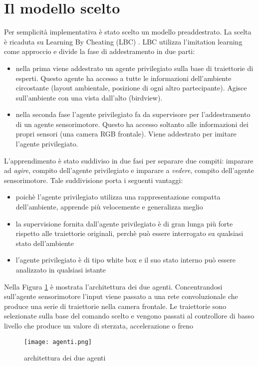 \section{Il modello scelto}
Per semplicità implementativa è stato scelto un modello preaddestrato. La scelta è ricaduta su Learning By Cheating (LBC) \cite{lbc}. LBC utilizza l'imitation learning come
approccio e divide la fase di addestramento in due parti: \begin{itemize}
    \item nella prima viene addestrato un agente privilegiato sulla base di traiettorie di esperti. Questo agente ha accesso a tutte le informazioni 
    dell'ambiente circostante (layout ambientale, posizione di ogni altro partecipante). Agisce sull'ambiente con una vista dall'alto (birdview).
    \item nella seconda fase l'agente privilegiato fa da supervisore per l'addestramento di un agente sensorimotore. Questo ha accesso soltanto alle informazioni dei
    propri sensori (una camera RGB frontale). Viene addestrato per imitare l'agente privilegiato.
\end{itemize}
L'apprendimento è stato suddiviso in due fasi per separare due compiti: imparare ad \emph{agire}, compito dell'agente privilegiato e imparare a \emph{vedere}, compito dell'agente sensorimotore.
Tale suddivisione porta i seguenti vantaggi:\begin{itemize}
    \item poichè l'agente privilegiato utilizza una rappresentazione compatta dell'ambiente, apprende più velocemente e generalizza meglio
    \item la supervisione fornita dall'agente privilegiato è di gran lunga più forte rispetto alle traiettorie originali, perchè può essere interrogato 
    su qualsiasi stato dell'ambiente
    \item l'agente privilegiato è di tipo white box e il suo stato interno può essere analizzato in qualsiasi istante
\end{itemize}
Nella Figura \ref{fig:arch} è mostrata l'architettura dei due agenti. Concentrandosi sull'agente sensorimotore  l'input viene passato a una rete convoluzionale che produce una serie di 
traiettorie nella camera frontale. Le traiettorie  sono selezionate sulla base del comando scelto e vengono passati al controllore di basso livello che produce un valore di sterzata, accelerazione o freno
\begin{figure}[h!]
    \texttt{[image: agenti.png]}
    \caption{architettura dei due agenti\cite{lbc}}
    \label{fig:arch}
\end{figure}

